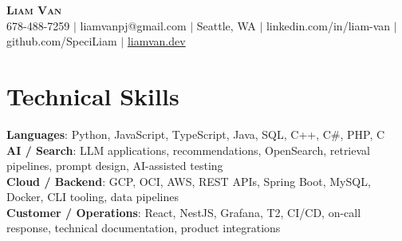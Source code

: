 \documentclass[letterpaper,11pt]{article}
\begin{document}

%
\begin{center}
    \textbf{\Huge \scshape Liam Van} \\ \vspace{1pt}
    \small 678-488-7259 $|$ \small {liamvanpj@gmail.com} $|$ Seattle, WA
 {{$|$ linkedin.com/in/liam-van} {$|$ github.com/SpeciLiam} {$|$ \href{https://liamvan.dev}{liamvan.dev}}}

\end{center}

\section{Technical Skills}
 \begin{itemize}[leftmargin=0.15in, label={}]
    \small{\item{
     \textbf{Languages}{: Python, JavaScript, TypeScript, Java, SQL, C++, C\#, PHP, C} \\
     \textbf{AI / Search}{: LLM applications, recommendations, OpenSearch, retrieval pipelines, prompt design, AI-assisted testing} \\
     \textbf{Cloud / Backend}{: GCP, OCI, AWS, REST APIs, Spring Boot, MySQL, Docker, CLI tooling, data pipelines} \\
     \textbf{Customer / Operations}{: React, NestJS, Grafana, T2, CI/CD, on-call response, technical documentation, product integrations} \\
    }}
 \end{itemize}
%
\end{document}

